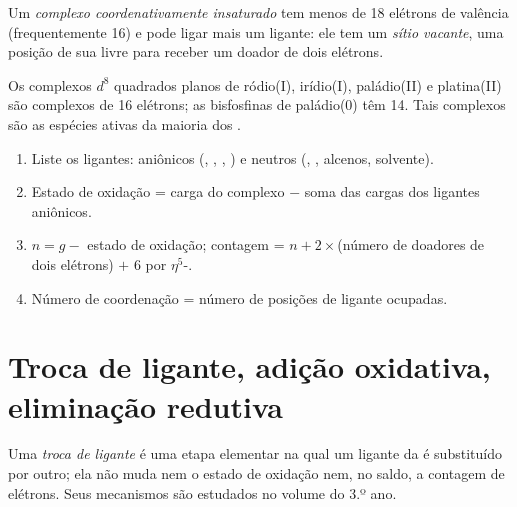 \begin{definition}\label{def:b2:catalytic-cycles:unsaturated}
Um \emph{complexo coordenativamente insaturado}
tem menos de 18 elétrons de valência (frequentemente 16) e pode ligar mais um
ligante: ele tem um \emph{sítio vacante}, uma posição de sua  livre para receber um doador de dois elétrons.
\end{definition}

Os complexos $d^8$ quadrados planos de ródio(I), irídio(I), paládio(II) e
platina(II) são complexos de 16 elétrons; as bisfosfinas de paládio(0) 
têm 14. Tais complexos são as espécies ativas da maioria dos .

\begin{method}\label{met:b2:catalytic-cycles:count-organometallic}
\begin{enumerate}
  \item Liste os ligantes: aniônicos (, , , ) e neutros
        (, , alcenos, solvente).
  \item Estado de oxidação = carga do complexo $-$ soma das cargas dos ligantes aniônicos.
  \item $n = g -$ estado de oxidação; contagem = $n + 2 \times$(número de doadores de dois elétrons)
        $+$ 6 por $\eta^5$-.
  \item Número de coordenação = número de posições de ligante ocupadas.
\end{enumerate}
\end{method}

\section{Troca de ligante, adição oxidativa, eliminação redutiva}

\begin{definition}\label{def:b2:catalytic-cycles:ligand-exchange}
Uma \emph{troca de ligante} é uma etapa elementar na qual um ligante da
 é substituído por outro; ela não muda nem o estado de
oxidação nem, no saldo, a contagem de elétrons. Seus mecanismos são estudados
no volume do 3.º ano.
\end{definition}

